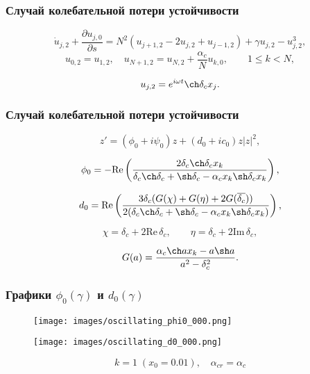 \documentclass[fullscreen=true, unicode, bookmarks=false]{beamer}
\begin{document}
\begin{frame}
\frametitle{ Случай колебательной потери устойчивости }

\begin{equation}
	\dot u_{j,2} + \frac{\partial u_{j,0}}{\partial s} = N^2(u_{j+1,2} - 2u_{j,2} + u_{j-1,2}) + \gamma u_{j,2} - u_{j,2}^3,
\end{equation}
\begin{equation}
	u_{0,2} = u_{1,2}, \quad u_{N+1,2} = u_{N,2} + \dfrac{\alpha_c}{N}u_{k,0}, \qquad 1 \le k < N,
\end{equation}

\bigskip

$$ u_{j,2} = e^{i \omega t} \ch \delta_c x_j. $$

\end{frame}

\begin{frame}
\frametitle{ Случай колебательной потери устойчивости }

\begin{equation}
	z' = (\phi_0 + i \psi_0) z + (d_0 + i c_0) z |z|^2,
\end{equation}

\bigskip

$$ \phi_0 = -\mbox{Re} \left(\dfrac{2 \delta_c \ch \delta_c x_k}{\delta_c\ch \delta_c + \sh \delta_c - \alpha_c x_k \sh \delta_c x_k} \right), $$

$$ d_0 = \mbox{Re} \left( \dfrac{3 \delta_c (G(\chi) + G(\eta) + 2G(\overline{\delta_c}) )}{2(\delta_c\ch \delta_c + \sh \delta_c - \alpha_c x_k \sh \delta_c x_k)} \right), $$

\bigskip

$$ \chi = \delta_c + 2 \mbox{Re}\,\delta_c, \qquad \eta = \delta_c + 2 \mbox{Im}\,\delta_c, $$

$$ G(a) = \dfrac{\alpha_c \ch a x_k - a \sh a}{a^2 - \delta_c^2}. $$

\end{frame}

\begin{frame}
\frametitle{ Графики $ \phi_0(\gamma) $ и $ d_0(\gamma) $ }

\begin{figure} 
\begin{minipage}[h]{0.49\linewidth}
\begin{center}
\texttt{[image: images/oscillating\_phi0\_000.png]}
\end{center}
\end{minipage} 
\hfill
\begin{minipage}[h]{0.49\linewidth}
\begin{center}
\texttt{[image: images/oscillating\_d0\_000.png]} 
\end{center}
\end{minipage} 
\end{figure}

$$ k = 1 \; (x_0=0.01), \quad \alpha_{cr}=\alpha_c $$

\end{frame}
\end{document}
